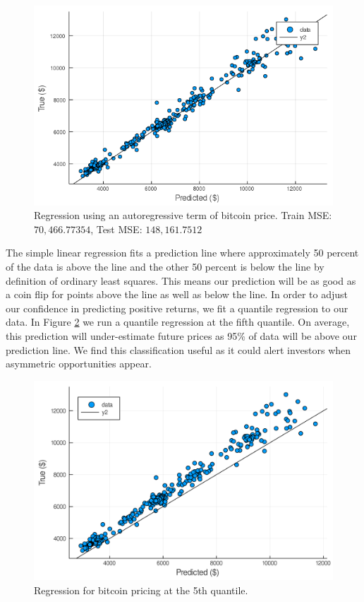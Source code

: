 \documentclass[9pt,twocolumn,twoside]{ilcss}
\begin{document}
\begin{figure}[h]
\centering
\includegraphics[width=.8\linewidth]{Regression_on_price.png}
\caption{Regression using an autoregressive term of bitcoin price. Train MSE: $70,466.77354$, Test MSE: $148,161.7512$}
\label{reg_yes_trans}
\end{figure}

The simple linear regression fits a prediction line where approximately 50 percent of the data is above the line and the other 50 percent is below the line by definition of ordinary least squares. This means our prediction will be as good as a coin flip for points above the line as well as below the line.
In order to adjust our confidence in predicting positive returns, we fit a quantile regression to our data. In Figure \ref{quantile_reg_price} we run a quantile regression at the fifth quantile. On average, this prediction will under-estimate future prices as 95\% of data will be above our prediction line. We find this classification useful as it could alert investors when asymmetric opportunities appear. 

\begin{figure}[h]
\centering
\includegraphics[width=.8\linewidth]{quantile_reg_price.png}
\caption{Regression for bitcoin pricing at the 5th quantile.}
\label{quantile_reg_price}
\end{figure}
\end{document}
